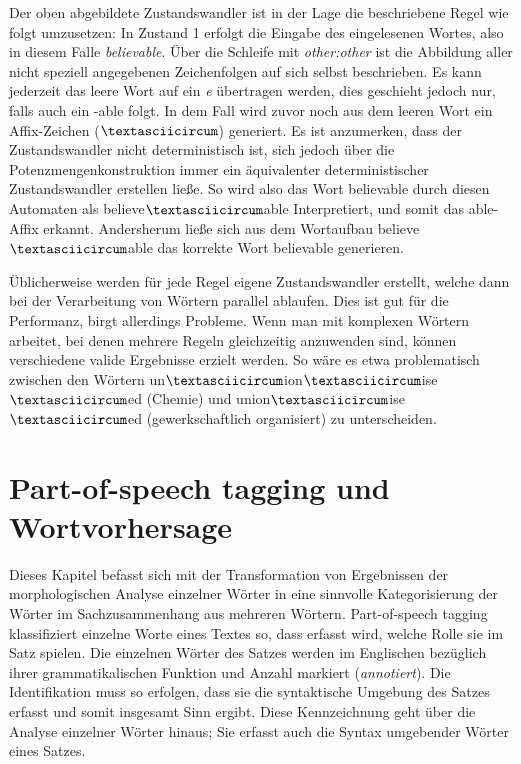 \documentclass[12pt]{report}
\begin{document}
Der oben abgebildete Zustandswandler ist in der Lage die beschriebene Regel wie folgt umzusetzen: In Zustand 1 erfolgt die Eingabe des eingelesenen Wortes, also in diesem Falle \textit{\glqq  believable\grqq{}}. Über die Schleife mit \textit{\glqq  other:other\grqq{}} ist die Abbildung aller nicht speziell angegebenen Zeichenfolgen auf sich selbst beschrieben. Es kann jederzeit das leere Wort auf ein \textit{\glqq  e\grqq{}} übertragen werden, dies geschieht jedoch nur, falls auch ein \glqq  -able\grqq{} folgt. In dem Fall wird zuvor noch aus dem leeren Wort ein Affix-Zeichen ($\textasciicircum$) generiert. Es ist anzumerken, dass der Zustandswandler nicht deterministisch ist, sich jedoch über die Potenzmengenkonstruktion immer ein äquivalenter deterministischer Zustandswandler erstellen ließe. So wird also das Wort \glqq  believable\grqq{} durch diesen Automaten als \glqq  believe$\textasciicircum$able\grqq{} Interpretiert, und somit das \glqq  able\grqq{}-Affix erkannt. Andersherum ließe sich aus dem Wortaufbau \glqq  believe$\textasciicircum$able\grqq{} das korrekte Wort \glqq  believable\grqq{} generieren.

Üblicherweise werden für jede Regel eigene Zustandswandler erstellt, welche dann bei der Verarbeitung von Wörtern parallel ablaufen. Dies ist gut für die Performanz, birgt allerdings Probleme. Wenn man mit komplexen Wörtern arbeitet, bei denen mehrere Regeln gleichzeitig anzuwenden sind, können verschiedene valide Ergebnisse erzielt werden. So wäre es etwa problematisch zwischen den Wörtern \glqq  un$\textasciicircum$ion$\textasciicircum$ise$\textasciicircum$ed\grqq{} (Chemie) und \glqq  union$\textasciicircum$ise$\textasciicircum$ed\grqq{} (gewerkschaftlich organisiert) zu unterscheiden. 

\section[POS tagging und Wortvorhersage]{Part-of-speech tagging und \\Wortvorhersage}
Dieses Kapitel befasst sich mit der Transformation von Ergebnissen der morphologischen Analyse einzelner Wörter in eine sinnvolle Kategorisierung der Wörter im Sachzusammenhang aus mehreren Wörtern. Part-of-speech tagging klassifiziert einzelne Worte eines Textes so, dass erfasst wird, welche Rolle sie im Satz spielen. Die einzelnen Wörter des Satzes werden im Englischen bezüglich ihrer grammatikalischen Funktion und Anzahl markiert (\textit{annotiert}). Die Identifikation muss so erfolgen, dass sie die syntaktische Umgebung des Satzes erfasst und somit insgesamt Sinn ergibt. Diese Kennzeichnung geht über die Analyse einzelner Wörter hinaus; Sie erfasst auch die Syntax umgebender Wörter eines Satzes. 
\end{document}
